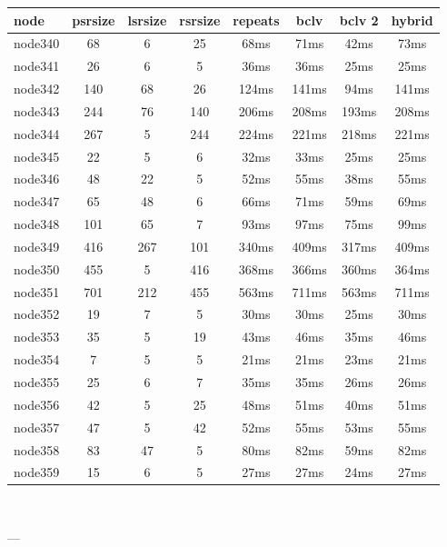 \begin{tabular}{|l|c|c|c|c|c|c|c|}
\hline node & psrsize & lsrsize & rsrsize   & repeats & bclv & bclv 2 & hybrid\\
    \hline node340 & 68 & 6 & 25 & 68ms & 71ms & 42ms & 73ms\\
    \hline node341 & 26 & 6 & 5 & 36ms & 36ms & 25ms & 25ms\\
    \hline node342 & 140 & 68 & 26 & 124ms & 141ms & 94ms & 141ms\\
    \hline node343 & 244 & 76 & 140 & 206ms & 208ms & 193ms & 208ms\\
    \hline node344 & 267 & 5 & 244 & 224ms & 221ms & 218ms & 221ms\\
    \hline node345 & 22 & 5 & 6 & 32ms & 33ms & 25ms & 25ms\\
    \hline node346 & 48 & 22 & 5 & 52ms & 55ms & 38ms & 55ms\\
    \hline node347 & 65 & 48 & 6 & 66ms & 71ms & 59ms & 69ms\\
    \hline node348 & 101 & 65 & 7 & 93ms & 97ms & 75ms & 99ms\\
    \hline node349 & 416 & 267 & 101 & 340ms & 409ms & 317ms & 409ms\\
    \hline node350 & 455 & 5 & 416 & 368ms & 366ms & 360ms & 364ms\\
    \hline node351 & 701 & 212 & 455 & 563ms & 711ms & 563ms & 711ms\\
    \hline node352 & 19 & 7 & 5 & 30ms & 30ms & 25ms & 30ms\\
    \hline node353 & 35 & 5 & 19 & 43ms & 46ms & 35ms & 46ms\\
    \hline node354 & 7 & 5 & 5 & 21ms & 21ms & 23ms & 21ms\\
    \hline node355 & 25 & 6 & 7 & 35ms & 35ms & 26ms & 26ms\\
    \hline node356 & 42 & 5 & 25 & 48ms & 51ms & 40ms & 51ms\\
    \hline node357 & 47 & 5 & 42 & 52ms & 55ms & 53ms & 55ms\\
    \hline node358 & 83 & 47 & 5 & 80ms & 82ms & 59ms & 82ms\\
    \hline node359 & 15 & 6 & 5 & 27ms & 27ms & 24ms & 27ms\\

\hline
\end{tabular} \

---



